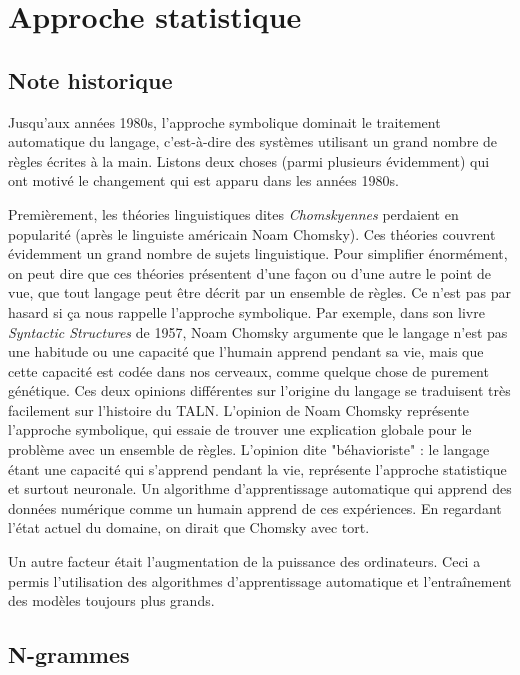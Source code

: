 \documentclass[11pt, a4paper]{report}
\begin{document}
  \section{Approche statistique}
  \subsection{Note historique}
  Jusqu'aux années 1980s, l'approche symbolique dominait le traitement automatique du langage, 
  c'est-à-dire des systèmes utilisant un grand nombre de règles écrites à la main. Listons deux
  choses (parmi plusieurs évidemment) qui ont motivé le changement qui est apparu dans les années 
  1980s. 

  Premièrement, les théories linguistiques dites \textit{Chomskyennes} perdaient en popularité
  (après le linguiste américain Noam Chomsky). Ces théories couvrent évidemment un grand nombre 
  de sujets linguistique. Pour simplifier énormément, on peut dire que ces théories 
  présentent d'une façon ou d'une autre le point de vue, que tout langage peut être décrit par 
  un ensemble de règles. Ce n'est pas par hasard si ça nous rappelle l'approche symbolique. 
  Par exemple, dans son livre \textit{Syntactic Structures} de 1957, Noam Chomsky argumente 
  que le langage n'est pas une habitude ou une capacité que l'humain apprend pendant sa vie, 
  mais que cette capacité est codée dans nos cerveaux, comme quelque chose de purement génétique.
  Ces deux opinions différentes sur l'origine du langage se traduisent très facilement sur l'histoire 
  du TALN. L'opinion de Noam Chomsky représente l'approche symbolique, qui essaie de trouver une 
  explication globale pour le problème avec un ensemble de règles. L'opinion dite "béhavioriste" : 
  le langage étant une capacité qui s'apprend pendant la vie, représente l'approche statistique 
  et surtout neuronale. Un algorithme d'apprentissage automatique qui apprend des données 
  numérique comme un humain apprend de ces expériences. En regardant l'état actuel du domaine, 
  on dirait que Chomsky avec tort. 
  
  Un autre facteur était l'augmentation de la puissance des ordinateurs. Ceci a permis l'utilisation 
  des algorithmes d'apprentissage automatique et l'entraînement des modèles toujours plus grands. 

  \subsection{N-grammes}
\end{document}
